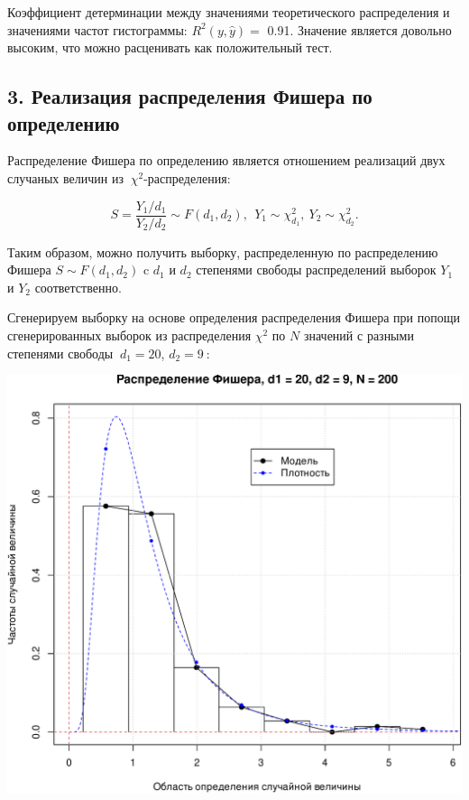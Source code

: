 \documentclass[
]{article}
\begin{document}
Коэффициент детерминации между значениями теоретического распределения и
значениями частот гистограммы: \(R^2(y, \hat{y}) =\) 0.91. Значение
является довольно высоким, что можно расценивать как положительный тест.

\hypertarget{ux440ux435ux430ux43bux438ux437ux430ux446ux438ux44f-ux440ux430ux441ux43fux440ux435ux434ux435ux43bux435ux43dux438ux44f-ux444ux438ux448ux435ux440ux430-ux43fux43e-ux43eux43fux440ux435ux434ux435ux43bux435ux43dux438ux44e}{%
\subsection{\texorpdfstring{\textbf{3. Реализация распределения Фишера
по
определению}}{3. Реализация распределения Фишера по определению}}\label{ux440ux435ux430ux43bux438ux437ux430ux446ux438ux44f-ux440ux430ux441ux43fux440ux435ux434ux435ux43bux435ux43dux438ux44f-ux444ux438ux448ux435ux440ux430-ux43fux43e-ux43eux43fux440ux435ux434ux435ux43bux435ux43dux438ux44e}}

Распределение Фишера по определению является отношением реализаций двух
случаных величин из \(\ \chi^2\)-распределения:

\[
S = \frac{Y_1/d_1}{Y_2/d_2} \sim F(d_1, d_2),\ \ Y_1 \sim \chi_{d_1}^2, \ Y_2 \sim \chi_{d_2}^2.
\]

Таким образом, можно получить выборку, распределенную по распределению
Фишера \(S \sim F(d_1, d_2)\) c \(d_1\) и \(d_2\) степенями свободы
распределений выборок \(Y_1\) и \(Y_2\) соответственно.

Сгенерируем выборку на основе определения распределения Фишера при
попощи сгенерированных выборок из распределения \(\chi^2\) по \(N\)
значений с разными степенями свободы \(\ d_1 = 20\), \(d_2 = 9\ \):

\begin{center}\includegraphics[width=0.6\linewidth]{Prac4_files/figure-latex/unnamed-chunk-7-1} \end{center}
\end{document}
